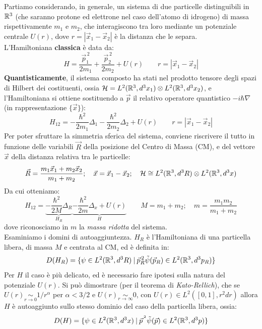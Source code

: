 \documentclass[../../FisicaTeorica.tex]{subfiles}
\begin{document}
Partiamo considerando, in generale, un sistema di due particelle distinguibili in $\mathbb{R}^3$ (che saranno protone ed elettrone nel caso dell'atomo di idrogeno) di massa rispettivamente $m_1$ e $m_2$, che interagiscono tra loro mediante un potenziale centrale $U(r)$, dove $r=|\vec{x}_1 - \vec{x}_2|$ è la distanza che le separa.\\
L'Hamiltoniana \textbf{classica} è data da:
\[
H=\frac{\vec{p}_1^{\,2}}{2m_1}+\frac{\vec{p}_2^{\,2}}{2m_2}+U(r)\qquad r=|\vec{x}_1 - \vec{x}_2|
\]
\textbf{Quantisticamente}, il sistema composto ha stati nel prodotto tensore degli spazi di Hilbert dei costituenti, ossia $\mathcal{H}=L^2(\mathbb{R}^3, d^3x_1)\otimes L^2(\mathbb{R}^3, d^3x_2)$, e l'Hamiltoniana si ottiene sostituendo a $\vec{p}$  il relativo operatore quantistico $-i\hbar \nabla$ (in rappresentazione $\{\vec{x}\}$):
\[
H_{12} = -\frac{\hbar^2}{2m_1} \Delta_1 - \frac{\hbar^2}{2m_2} \Delta_2 + U(r)\qquad r=|\vec{x}_1 - \vec{x}_2|
\]
Per poter sfruttare la simmetria sferica del sistema, conviene riscrivere il tutto in funzione delle variabili $\vec{R}$ della posizione del Centro di Massa (CM), e del vettore $\vec{x}$ della distanza relativa tra le particelle:
\[
\vec{R}=\frac{m_1 \vec{x}_1 + m_2 \vec{x}_2}{m_1+m_2}; \quad \vec{x}=\vec{x}_1 -\vec{x}_2; \quad \mathcal{H} \cong L^2(\mathbb{R}^3, d^3R) \otimes L^2(\mathbb{R}^3, d^3x)
\]
Da cui otteniamo:
\[
H_{12}=\underbrace{-\frac{\hbar^2}{2M}\Delta_R}_{H_R} \underbrace{- \frac{\hbar^2}{2m}\Delta_x + U(r)}_{H}\qquad M=m_1+m_2; \quad m=\frac{m_1 m_2}{m_1+m_2}
\]
dove riconosciamo in $m$ la \textit{massa ridotta} del sistema.\\
Esaminiamo i domini di autoaggiuntezza. $H_R$ è l'Hamiltoniana di una particella libera, di massa $M$ e centrata al CM, ed è definita in:
\[
D(H_R)=\{\psi\in L^2(\mathbb{R}^3, d^3R) \>|\> \vec{p}_R^{\,2} \tilde{\psi}(\vec{p}_R) \in L^2(\mathbb{R}^3, d^3 p_R)\}
\]
Per $H$ il caso è più delicato, ed è necessario fare ipotesi sulla natura del potenziale $U(r)$. Si può dimostrare (per il teorema di \textit{Kato-Rellich}), che se $U(r) \underset{r\to 0}{\sim} 1/r^\alpha$ per $\alpha < 3/2$ e $U(r) \underset{r\to\infty}{\sim}0$, con $U(r) \in L^2([0,1], r^2 dr)$ allora $H$ è autoaggiunto sullo stesso dominio del caso della particella libera, ossia:
\[
D(H) = \{\psi \in L^2(\mathbb{R}^3, d^3 x)\>|\> \vec{p}^{\,^2} \tilde{\psi}(\vec{p}) \in L^2(\mathbb{R}^3, d^3 p)\}
\]
\end{document}
